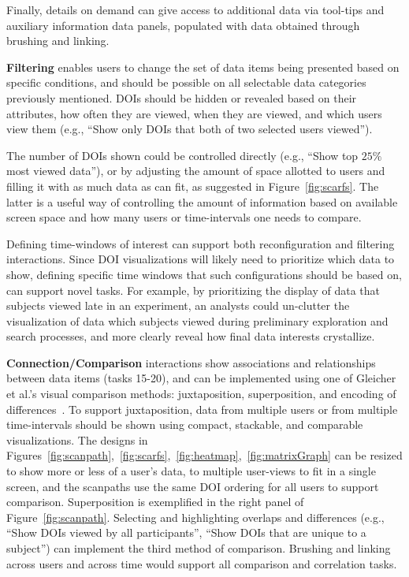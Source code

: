  Finally, details on demand can give access to additional data via tool-tips and auxiliary information data panels, populated with data obtained through brushing and linking.
  
	
\noindent \textbf{Filtering} enables users to change the set of data items being presented based on specific conditions, and should be possible on all selectable data categories previously mentioned. DOIs should be hidden or revealed based on their attributes, how often they are viewed, when they are viewed, and which users view them (e.g., ``Show only DOIs that both of two selected users viewed'').

The number of DOIs shown could be controlled directly (e.g., ``Show top $25\%$ most viewed data''), or by adjusting the amount of space allotted to users and filling it with as much data as can fit, as suggested in Figure~\ref{fig:scarfs}. The latter is a useful way of controlling the amount of information based on available screen space and how many users or time-intervals one needs to compare.

Defining time-windows of interest can support both reconfiguration and filtering interactions. Since DOI visualizations will likely need to prioritize which data to show, defining specific time windows that such configurations should be based on, can support novel tasks. For example, by prioritizing the display of data that subjects viewed late in an experiment, an analysts could un-clutter the visualization of data which subjects viewed during preliminary exploration and search processes, and more clearly reveal how final data interests crystallize.


	
\noindent \textbf{Connection/Comparison} interactions show associations and relationships between data items (tasks 15-20), and can be implemented using one of Gleicher et al.'s visual comparison methods: juxtaposition, superposition, and encoding of differences~\cite{gleicher2011visual}. To support juxtaposition, data from multiple users or from multiple time-intervals should be shown using compact, stackable, and comparable visualizations. The designs in Figures~\ref{fig:scanpath},~\ref{fig:scarfs},~\ref{fig:heatmap},~\ref{fig:matrixGraph} can be resized to show more or less of a user's data, to multiple user-views to fit in a single screen, and the scanpaths use the same DOI ordering for all users to support comparison. Superposition is exemplified in the right panel of Figure~\ref{fig:scanpath}. Selecting and highlighting overlaps and differences (e.g., ``Show DOIs viewed by all participants'', ``Show DOIs that are unique to a subject'') can implement the third method of comparison. Brushing and linking across users and across time would support all comparison and correlation tasks.

